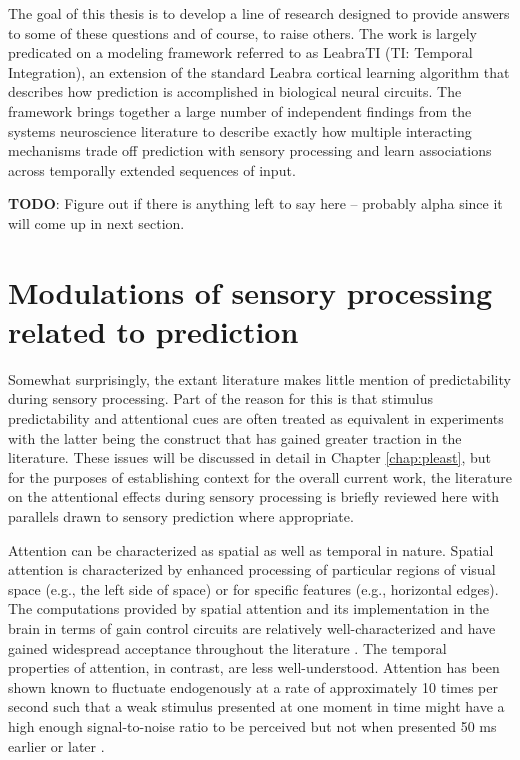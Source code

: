 \documentclass[dwyatte_dissertation.tex]{subfiles}
\begin{document}
{The goal of this thesis is to develop a line of research designed to provide answers to some of these questions and of course, to raise others. The work is largely predicated on a modeling framework referred to as LeabraTI (TI: Temporal Integration), an extension of the standard Leabra cortical learning algorithm \cite{OReillyMunakata00,OReillyMunakataFrankEtAl12} that describes how prediction is accomplished in biological neural circuits. The framework brings together a large number of independent findings from the systems neuroscience literature to describe exactly how multiple interacting mechanisms trade off prediction with sensory processing and learn associations across temporally extended sequences of input. 


\textbf{TODO}: Figure out if there is anything left to say here -- probably alpha since it will come up in next section.

\section{Modulations of sensory processing related to prediction}
Somewhat surprisingly, the extant literature makes little mention of predictability during sensory processing. Part of the reason for this is that stimulus predictability and attentional cues are often treated as equivalent in experiments \cite{SummerfieldEgner09,KokRahnevJeheeEtAl12} with the latter being the construct that has gained greater traction in the literature. These issues will be discussed in detail in Chapter \ref{chap:pleast}, but for the purposes of establishing context for the overall current work, the literature on the attentional effects during sensory processing is briefly reviewed here with parallels drawn to sensory prediction where appropriate.

Attention can be characterized as spatial as well as temporal in nature. Spatial attention is characterized by enhanced processing of particular regions of visual space (e.g., the left side of space) or for specific features (e.g., horizontal edges). The computations provided by spatial attention and its implementation in the brain in terms of gain control circuits are relatively well-characterized and have gained widespread acceptance throughout the literature \cite[see][for comprehensive reviews]{DesimoneDuncan95,ReynoldsChelazzi04}. The temporal properties of attention, in contrast, are less well-understood. Attention has been shown known to fluctuate endogenously at a rate of approximately 10 times per second such that a weak stimulus presented at one moment in time might have a high enough signal-to-noise ratio to be perceived but not when presented 50 ms earlier or later \cite{VanRullenBuschDrewesEtAl11}. 

}
\end{document}
